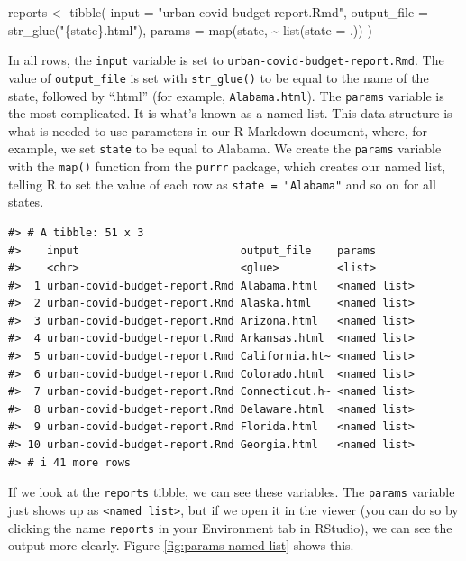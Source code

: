 \documentclass[
]{book}
\newenvironment{Shaded}{\begin{snugshade}}{\end{snugshade}}
\newcommand{\AttributeTok}[1]{\textcolor[rgb]{0.77,0.63,0.00}{#1}}
\newcommand{\FunctionTok}[1]{\textcolor[rgb]{0.00,0.00,0.00}{#1}}
\newcommand{\NormalTok}[1]{#1}
\newcommand{\OtherTok}[1]{\textcolor[rgb]{0.56,0.35,0.01}{#1}}
\newcommand{\SpecialCharTok}[1]{\textcolor[rgb]{0.00,0.00,0.00}{#1}}
\newcommand{\StringTok}[1]{\textcolor[rgb]{0.31,0.60,0.02}{#1}}
\begin{document}
\begin{Shaded}
\begin{Highlighting}[]
\NormalTok{reports }\OtherTok{\textless{}{-}} \FunctionTok{tibble}\NormalTok{(}
\AttributeTok{input =} \StringTok{"urban{-}covid{-}budget{-}report.Rmd"}\NormalTok{,}
\AttributeTok{output\_file =} \FunctionTok{str\_glue}\NormalTok{(}\StringTok{"\{state\}.html"}\NormalTok{),}
\AttributeTok{params =} \FunctionTok{map}\NormalTok{(state, }\SpecialCharTok{\textasciitilde{}} \FunctionTok{list}\NormalTok{(}\AttributeTok{state =}\NormalTok{ .))}
\NormalTok{)}
\end{Highlighting}
\end{Shaded}

In all rows, the \texttt{input} variable is set to \texttt{urban-covid-budget-report.Rmd}. The value of \texttt{output\_file} is set with \texttt{str\_glue()} to be equal to the name of the state, followed by ``.html'' (for example, \texttt{Alabama.html}). The \texttt{params} variable is the most complicated. It is what's known as a named list. This data structure is what is needed to use parameters in our R Markdown document, where, for example, we set \texttt{state} to be equal to Alabama. We create the \texttt{params} variable with the \texttt{map()} function from the \texttt{purrr} package, which creates our named list, telling R to set the value of each row as \texttt{state\ =\ "Alabama"} and so on for all states.

\begin{verbatim}
#> # A tibble: 51 x 3
#>    input                         output_file    params      
#>    <chr>                         <glue>         <list>      
#>  1 urban-covid-budget-report.Rmd Alabama.html   <named list>
#>  2 urban-covid-budget-report.Rmd Alaska.html    <named list>
#>  3 urban-covid-budget-report.Rmd Arizona.html   <named list>
#>  4 urban-covid-budget-report.Rmd Arkansas.html  <named list>
#>  5 urban-covid-budget-report.Rmd California.ht~ <named list>
#>  6 urban-covid-budget-report.Rmd Colorado.html  <named list>
#>  7 urban-covid-budget-report.Rmd Connecticut.h~ <named list>
#>  8 urban-covid-budget-report.Rmd Delaware.html  <named list>
#>  9 urban-covid-budget-report.Rmd Florida.html   <named list>
#> 10 urban-covid-budget-report.Rmd Georgia.html   <named list>
#> # i 41 more rows
\end{verbatim}

If we look at the \texttt{reports} tibble, we can see these variables. The \texttt{params} variable just shows up as \texttt{\textless{}named\ list\textgreater{}}, but if we open it in the viewer (you can do so by clicking the name \texttt{reports} in your Environment tab in RStudio), we can see the output more clearly. Figure \ref{fig:params-named-list} shows this.
\end{document}
